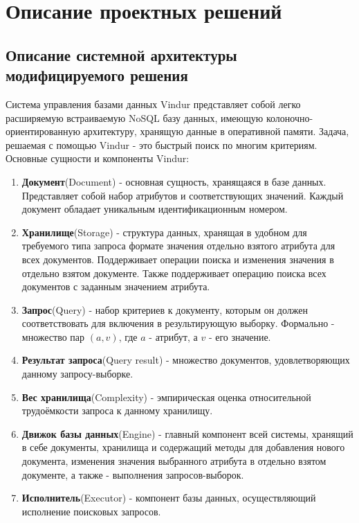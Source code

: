 \documentclass{matmex-diploma}
\begin{document}
\section{Описание проектных решений}
    \subsection{Описание системной архитектуры модифицируемого решения}
    Система управления базами данных Vindur представляет собой легко расширяемую встраиваемую NoSQL базу данных, имеющую колоночно-ориентированную архитектуру, хранящую данные в оперативной памяти. Задача, решаемая с помощью Vindur - это быстрый поиск по многим критериям. 
    Основные сущности и компоненты Vindur:
        \begin{enumerate}
            \item \textbf{Документ}(Document) - основная сущность, хранящаяся в базе данных. Представляет собой набор атрибутов и соответствующих значений. Каждый документ обладает уникальным идентификационным номером.                 
            \item \textbf{Хранилище}(Storage) - структура данных, хранящая в удобном для требуемого типа запроса формате значения отдельно взятого атрибута для всех документов. Поддерживает операции поиска и изменения значения в отдельно взятом документе. Также поддерживает операцию поиска всех документов с заданным значением атрибута.
            \item \textbf{Запрос}(Query) - набор критериев к документу, которым он должен соответствовать для включения в результирующую выборку. Формально - множество пар $(a, v)$, где $a$ - атрибут, а $v$ - его значение. 
            \item \textbf{Результат запроса}(Query result) - множество документов, удовлетворяющих данному запросу-выборке.
            \item \textbf{Вес хранилища}(Complexity) - эмпирическая оценка относительной трудоёмкости запроса к данному хранилищу.
            \item \textbf{Движок базы данных}(Engine) - главный компонент всей системы, хранящий в себе документы, хранилища и содержащий методы для добавления нового документа, изменения значения выбранного атрибута в отдельно взятом документе, а также - выполнения запросов-выборок.
            \item \textbf{Исполнитель}(Executor) - компонент базы данных, осуществляющий исполнение поисковых запросов.
        \end{enumerate}
    
\end{document}
